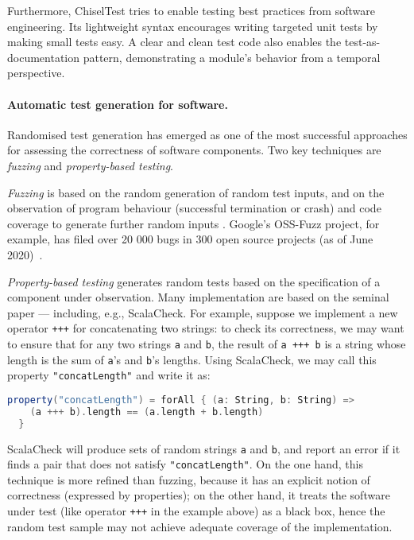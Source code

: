 \documentclass[fleqn,12pt]{article}
\begin{document}
Furthermore, ChiselTest tries to enable testing best practices from software engineering.
Its lightweight syntax encourages writing targeted unit tests by making small tests easy.
A clear and clean test code also enables the test-as-documentation pattern,
demonstrating a module's behavior from a temporal perspective.

{\color{blue}%
\paragraph{Automatic test generation for software.}
Randomised test generation has emerged as one of the most successful approaches
for assessing the correctness of software components. Two key techniques are \emph{fuzzing} and \emph{property-based testing}.

\emph{Fuzzing} is based on the random generation of random test inputs,
and on the observation of program behaviour (successful termination or crash) and code coverage
to generate further random inputs \cite{takanen2018fuzzing,DBLP:journals/tse/BohmePR19,DBLP:conf/pldi/FuS17}.
Google's OSS-Fuzz project, for example, has filed over 20 000 bugs in 300 open source
projects (as of June 2020)~\cite{web:oss-fuzz}.

\emph{Property-based testing} generates random tests based on the specification of a component under observation.
Many implementation are based on the seminal paper \cite{DBLP:conf/icfp/ClaessenH00} --- including, e.g., ScalaCheck.
For example, suppose we implement a new operator \texttt{+++} for concatenating two strings:
to check its correctness, we may want to ensure that for any two strings \texttt{a} and \texttt{b},
the result of \texttt{a\,+++\,b} is a string whose length is the sum of \texttt{a}'s and \texttt{b}'s lengths.
Using ScalaCheck, we may call this property \texttt{"concatLength"} and write it as:
%
\noindent%
\begin{lstlisting}[language=Scala,numbers=none]
  property("concatLength") = forAll { (a: String, b: String) =>
    (a +++ b).length == (a.length + b.length)
  }
\end{lstlisting}
%
\noindent%
ScalaCheck will produce sets of random strings \texttt{a} and \texttt{b}, and report an error if it finds a pair that does not satisfy \texttt{"concatLength"}. On the one hand, this technique is more refined than fuzzing, because it has an explicit notion of correctness (expressed by properties); on the other hand, it treats the software under test (like operator \texttt{+++} in the example above) as a black box, hence the random test sample may not achieve adequate coverage of the implementation.

}
\end{document}
